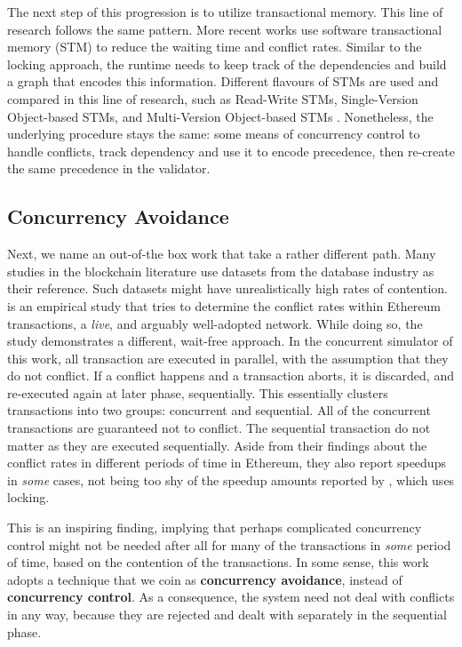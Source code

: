 The next step of this progression is to utilize transactional memory. This line of research follows
the same pattern. More recent works use software transactional memory (STM) to reduce the waiting
time and conflict rates. Similar to the locking approach, the runtime needs to keep track of the
dependencies and build a graph that encodes this information. Different flavours of STMs are used
and compared in this line of research, such as Read-Write STMs, Single-Version Object-based STMs,
and Multi-Version Object-based STMs
\cite{anjanaEfficientConcurrentExecution2019,anjanaEfficientFrameworkOptimistic2019}. Nonetheless,
the underlying procedure stays the same: some means of concurrency control to handle conflicts,
track dependency and use it to encode precedence, then re-create the same precedence in the
validator.


\subsection{Concurrency Avoidance}

Next, we name an out-of-the box work that take a rather different path. Many studies in the
blockchain literature use datasets from the database industry as their reference. Such datasets
might have unrealistically high rates of contention. \cite{saraphEmpiricalStudySpeculative2019} is
an empirical study that tries to determine the conflict rates within Ethereum transactions, a
\textit{live}, and arguably well-adopted network. While doing so, the study demonstrates a
different, wait-free approach. In the concurrent simulator of this work, all transaction are
executed in parallel, with the assumption that they do not conflict. If a conflict happens and a
transaction aborts, it is discarded, and re-executed again at later phase, sequentially. This
essentially clusters transactions into two groups: concurrent and sequential. All of the concurrent
transactions are guaranteed not to conflict. The sequential transaction do not matter as they are
executed sequentially. Aside from their findings about the conflict rates in different periods of
time in Ethereum, they also report speedups in \textit{some} cases, not being too shy of the speedup
amounts reported by \cite{dickersonSmartLocksAddingConcurrency2017}, which uses locking.

This is an inspiring finding, implying that perhaps complicated concurrency control might not be
needed after all for many of the transactions in \textit{some} period of time, based on the
contention of the transactions. In some sense, this work adopts a technique that we coin as
\textbf{concurrency avoidance}, instead of \textbf{concurrency control}. As a consequence, the system
need not deal with conflicts in any way, because they are rejected and dealt with separately in
the sequential phase.


